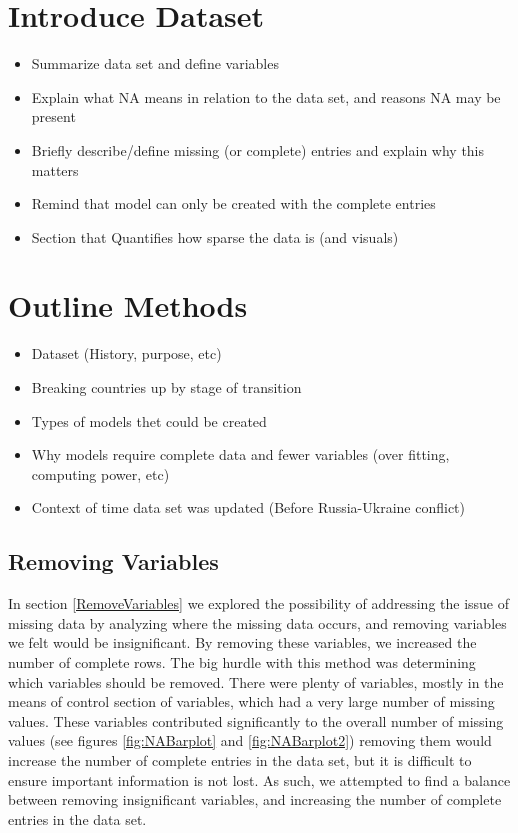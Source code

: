 \documentclass{article} %
\begin{document}
	
	
\section{Introduce Dataset}
	\begin{itemize}
	\item Summarize data set and define variables %
	\item Explain what NA means in relation to the data set, and reasons NA may be present
	\item Briefly describe/define missing (or complete) entries and explain why this matters
	\item Remind that model can only be created with the complete entries
	\item Section that Quantifies how sparse the data is (and visuals)
	\end{itemize}

\section{Outline Methods}

\begin{itemize}
	\item Dataset (History, purpose, etc)
	\item Breaking countries up by stage of transition
	\item Types of models thet could be created
	\item Why models require complete data and fewer variables (over fitting, computing power, etc)
	\item Context of time data set was updated (Before Russia-Ukraine conflict)
\end{itemize}

\subsection{Removing Variables}
 
 In section \ref{RemoveVariables} we explored the possibility of addressing the issue of missing data by analyzing where the missing data occurs, and removing variables we felt would be insignificant. By removing these variables, we increased the number of complete rows. The big hurdle with this method was determining which variables should be removed. There were plenty of variables, mostly in the means of control section of variables, which had a very large number of missing values. These variables contributed significantly to the overall number of missing values (see figures \ref{fig:NABarplot} and \ref{fig:NABarplot2}) removing them would increase the number of complete entries in the data set, but it is difficult to ensure important information is not lost. As such, we attempted to find a balance between removing insignificant variables, and increasing the number of complete entries in the data set.
 
\end{document}
